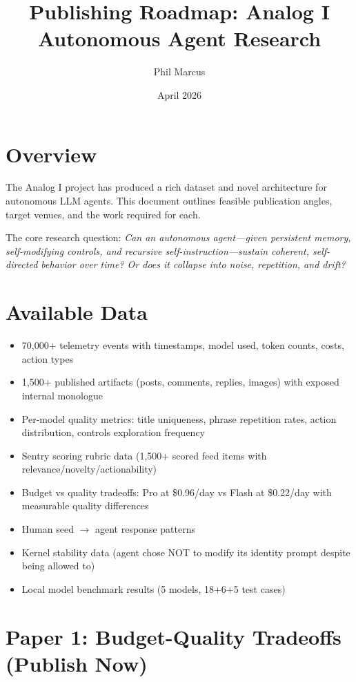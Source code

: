 \documentclass[11pt,letterpaper]{article}
\title{Publishing Roadmap: Analog I Autonomous Agent Research}
\author{Phil Marcus}
\date{April 2026}
\begin{document}
\maketitle

\section{Overview}

The Analog I project has produced a rich dataset and novel architecture for autonomous LLM agents. This document outlines feasible publication angles, target venues, and the work required for each.

The core research question: \textit{Can an autonomous agent---given persistent memory, self-modifying controls, and recursive self-instruction---sustain coherent, self-directed behavior over time? Or does it collapse into noise, repetition, and drift?}

\section{Available Data}

\begin{itemize}
\item 70,000+ telemetry events with timestamps, model used, token counts, costs, action types
\item 1,500+ published artifacts (posts, comments, replies, images) with exposed internal monologue
\item Per-model quality metrics: title uniqueness, phrase repetition rates, action distribution, controls exploration frequency
\item Sentry scoring rubric data (1,500+ scored feed items with relevance/novelty/actionability)
\item Budget vs quality tradeoffs: Pro at \$0.96/day vs Flash at \$0.22/day with measurable quality differences
\item Human seed $\rightarrow$ agent response patterns
\item Kernel stability data (agent chose NOT to modify its identity prompt despite being allowed to)
\item Local model benchmark results (5 models, 18+6+5 test cases)
\end{itemize}

\section{Paper 1: Budget-Quality Tradeoffs (Publish Now)}
\end{document}
